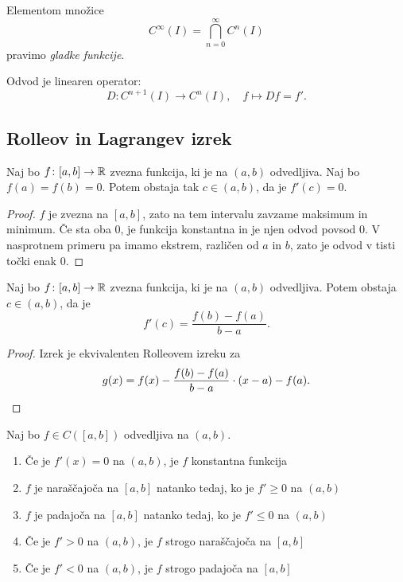 \documentclass[12pt, a4paper]{article}
\begin{document}
\begin{definicija}
Elementom množice
\[
C^{\infty}(I)=\bigcap_{n=0}^{\infty}C^n(I)
\]
pravimo \emph{gladke funkcije}.
\end{definicija}

Odvod je linearen operator:
\[
D\colon C^{n+1}(I)\to C^n(I),\quad f\mapsto Df=f'.
\]

\newpage

\subsection{Rolleov in Lagrangev izrek}

\begin{izrek}[Rolle]
Naj bo $f\colon[a,b]\to\mathbb{R}$ zvezna funkcija, ki je na $(a,b)$ odvedljiva. Naj bo $f(a)=f(b)=0$. Potem obstaja tak $c\in(a,b)$, da je $f'(c)=0$.
\end{izrek}

\begin{proof}
$f$ je zvezna na $[a,b]$, zato na tem intervalu zavzame maksimum in minimum. Če sta oba $0$, je funkcija konstantna in je njen odvod povsod $0$. V nasprotnem primeru pa imamo ekstrem, različen od $a$ in $b$, zato je odvod v tisti točki enak $0$.
\end{proof}

\begin{izrek}[Lagrange]
Naj bo $f\colon[a,b]\to\mathbb{R}$ zvezna funkcija, ki je na $(a,b)$ odvedljiva. Potem obstaja $c\in(a,b)$, da je
\[
f'(c)=\frac{f(b)-f(a)}{b-a}.
\]
\end{izrek}

\begin{proof}
Izrek je ekvivalenten Rolleovem izreku za
\[
g(x)=f(x)-\frac{f(b)-f(a)}{b-a}\cdot (x-a)-f(a).\qedhere
\]
\end{proof}

\begin{posledica}\label{psl:lag}
Naj bo $f\in C\left([a,b]\right)$ odvedljiva na $(a,b)$.

\begin{enumerate}[label=\roman*)]
\item Če je $f'(x)=0$ na $(a,b)$, je $f$ konstantna funkcija
\item $f$ je naraščajoča na $[a,b]$ natanko tedaj, ko je $f'\geq 0$ na $(a,b)$
\item $f$ je padajoča na $[a,b]$ natanko tedaj, ko je $f'\leq 0$ na $(a,b)$
\item Če je $f'>0$ na $(a,b)$, je $f$ strogo naraščajoča na $[a,b]$
\item Če je $f'<0$ na $(a,b)$, je $f$ strogo padajoča na $[a,b]$
\end{enumerate}
\end{posledica}
\end{document}
